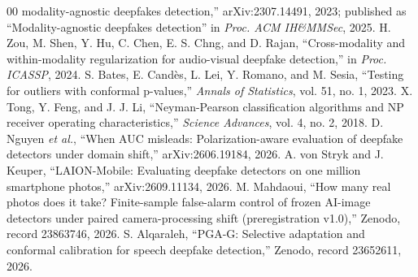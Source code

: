 \documentclass[conference]{IEEEtran}
\begin{document}
\begin{thebibliography}{00}
modality-agnostic deepfakes detection,'' arXiv:2307.14491, 2023; published as
``Modality-agnostic deepfakes detection'' in \textit{Proc. ACM IH\&MMSec},
2025.
 H. Zou, M. Shen, Y. Hu, C. Chen, E. S. Chng, and D. Rajan,
``Cross-modality and within-modality regularization for audio-visual
deepfake detection,'' in \textit{Proc. ICASSP}, 2024.
 S. Bates, E. Cand\`es, L. Lei, Y. Romano, and M. Sesia,
``Testing for outliers with conformal p-values,'' \textit{Annals of
Statistics}, vol. 51, no. 1, 2023.
 X. Tong, Y. Feng, and J. J. Li, ``Neyman-Pearson
classification algorithms and NP receiver operating characteristics,''
\textit{Science Advances}, vol. 4, no. 2, 2018.
 D. Nguyen \textit{et al.}, ``When AUC misleads:
Polarization-aware evaluation of deepfake detectors under domain shift,''
arXiv:2606.19184, 2026.
 A. von Stryk and J. Keuper, ``LAION-Mobile: Evaluating
deepfake detectors on one million smartphone photos,'' arXiv:2609.11134,
2026.
 M. Mahdaoui, ``How many real photos does it take?
Finite-sample false-alarm control of frozen AI-image detectors under paired
camera-processing shift (preregistration v1.0),'' Zenodo, record 23863746,
2026.
 S. Alqaraleh, ``PGA-G: Selective adaptation and conformal
calibration for speech deepfake detection,'' Zenodo, record 23652611, 2026.
\end{thebibliography}
\end{document}
